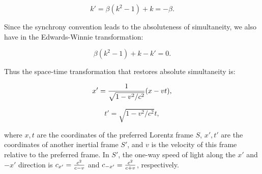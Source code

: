 \begin{equation}
k'= \beta(k^2 -1) + k = -\beta. 
\label{}
\end{equation}

\noindent Since the synchrony convention leads to the absoluteness of simultaneity, we also have in the Edwards-Winnie transformation:

\begin{equation}
\beta (k^2-1)+k-k'=0.
\label{}
\end{equation}

\noindent Thus the space-time transformation that restores absolute simultaneity is:

\begin{equation}
x'={1 \over \sqrt{1-v^2/c^2} } (x-vt),
\label{}
\end{equation}

\begin{equation}
t'=\sqrt{1-v^2/c^2} t,
\label{}
\end{equation}

\noindent where  $x,t$ are the coordinates of the preferred Lorentz frame $S$, $x',t'$ are the coordinates of another inertial frame $S'$, and $v$ is the velocity of this frame relative to the preferred frame. In $S'$, the one-way  speed of light along the $x'$ and $-x'$ direction is $c_{x'}={c^2 \over {c-v}}$ and $c_{-x'}={c^2 \over {c+v}}$, respectively.

